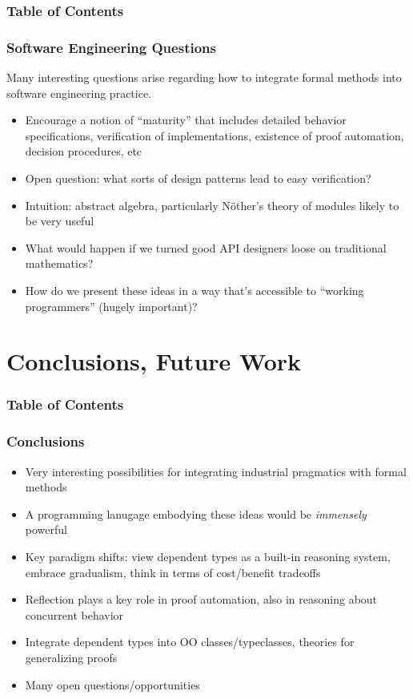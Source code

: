\documentclass{beamer}
\begin{document}
\begin{frame}
  \frametitle{Table of Contents}
  \tableofcontents[currentsection]
\end{frame}


\begin{frame}
  \frametitle{Software Engineering Questions}
  Many interesting questions arise regarding how to integrate
  formal methods into software engineering practice.
  \begin{itemize}
    \item Encourage a notion of ``maturity'' that includes detailed
      behavior specifications, verification of implementations,
      existence of proof automation, decision procedures, etc
    \item Open question: what sorts of design patterns lead to easy
      verification?
    \item Intuition: abstract algebra, particularly N\"{o}ther's
      theory of modules likely to be very useful
    \item What would happen if we turned good API designers loose on
      traditional mathematics?
    \item How do we present these ideas in a way that's accessible to
     ``working programmers'' (hugely important)?
  \end{itemize}
\end{frame}

\section{Conclusions, Future Work}

\begin{frame}
  \frametitle{Table of Contents}
  \tableofcontents[currentsection]
\end{frame}


\begin{frame}
  \frametitle{Conclusions}
  \begin{itemize}
    \item Very interesting possibilities for integrating industrial
      pragmatics with formal methods
    \item A programming lanugage embodying these ideas would be
      \emph{immensely} powerful
    \item Key paradigm shifts: view dependent types as a built-in
      reasoning system, embrace gradualism, think in terms of
      cost/benefit tradeoffs
    \item Reflection plays a key role in proof automation, also
      in reasoning about concurrent behavior
    \item Integrate dependent types into OO classes/typeclasses,
      theories for generalizing proofs
    \item Many open questions/opportunities
  \end{itemize}
\end{frame}
\end{document}
